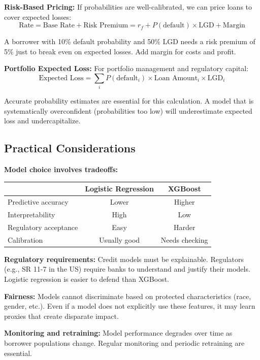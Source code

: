 \documentclass[11pt,a4paper]{article}
\begin{document}
\textbf{Risk-Based Pricing:} If probabilities are well-calibrated, we can price loans to cover expected losses:
\[
\text{Rate} = \text{Base Rate} + \text{Risk Premium} = r_f + P(\text{default}) \times \text{LGD} + \text{Margin}
\]

A borrower with 10\% default probability and 50\% LGD needs a risk premium of 5\% just to break even on expected losses. Add margin for costs and profit.

\textbf{Portfolio Expected Loss:} For portfolio management and regulatory capital:
\[
\text{Expected Loss} = \sum_{i} P(\text{default}_i) \times \text{Loan Amount}_i \times \text{LGD}_i
\]

Accurate probability estimates are essential for this calculation. A model that is systematically overconfident (probabilities too low) will underestimate expected loss and undercapitalize.

\subsection{Practical Considerations}

\textbf{Model choice involves tradeoffs:}
\begin{center}
\begin{tabular}{lcc}
\toprule
& \textbf{Logistic Regression} & \textbf{XGBoost} \\
\midrule
Predictive accuracy & Lower & Higher \\
Interpretability & High & Low \\
Regulatory acceptance & Easy & Harder \\
Calibration & Usually good & Needs checking \\
\bottomrule
\end{tabular}
\end{center}

\textbf{Regulatory requirements:} Credit models must be explainable. Regulators (e.g., SR 11-7 in the US) require banks to understand and justify their models. Logistic regression is easier to defend than XGBoost.

\textbf{Fairness:} Models cannot discriminate based on protected characteristics (race, gender, etc.). Even if a model does not explicitly use these features, it may learn proxies that create disparate impact.

\textbf{Monitoring and retraining:} Model performance degrades over time as borrower populations change. Regular monitoring and periodic retraining are essential.
\end{document}
